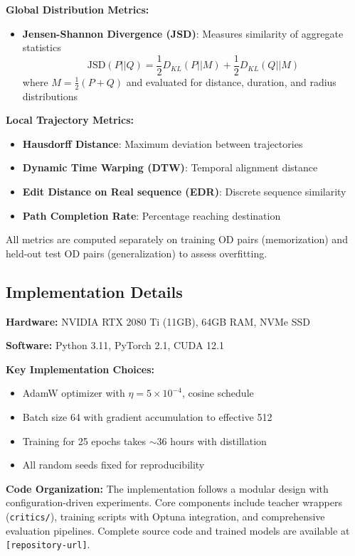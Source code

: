\textbf{Global Distribution Metrics:}
\begin{itemize}[noitemsep,topsep=0pt]
\item \textbf{Jensen-Shannon Divergence (JSD)}: Measures similarity of aggregate statistics
  \begin{equation}
  \text{JSD}(P||Q) = \frac{1}{2}D_{KL}(P||M) + \frac{1}{2}D_{KL}(Q||M)
  \end{equation}
  where $M = \frac{1}{2}(P + Q)$ and evaluated for distance, duration, and radius distributions
\end{itemize}

\textbf{Local Trajectory Metrics:}
\begin{itemize}[noitemsep,topsep=0pt]
\item \textbf{Hausdorff Distance}: Maximum deviation between trajectories
\item \textbf{Dynamic Time Warping (DTW)}: Temporal alignment distance
\item \textbf{Edit Distance on Real sequence (EDR)}: Discrete sequence similarity
\item \textbf{Path Completion Rate}: Percentage reaching destination
\end{itemize}

All metrics are computed separately on training OD pairs (memorization) and held-out test OD pairs (generalization) to assess overfitting.

\subsection{Implementation Details}
\label{sec:method-impl}

\textbf{Hardware:} NVIDIA RTX 2080 Ti (11GB), 64GB RAM, NVMe SSD

\textbf{Software:} Python 3.11, PyTorch 2.1, CUDA 12.1

\textbf{Key Implementation Choices:}
\begin{itemize}[noitemsep,topsep=0pt]
\item AdamW optimizer with $\eta = 5 \times 10^{-4}$, cosine schedule
\item Batch size 64 with gradient accumulation to effective 512
\item Training for 25 epochs takes $\sim$36 hours with distillation
\item All random seeds fixed for reproducibility
\end{itemize}

\textbf{Code Organization:} The implementation follows a modular design with configuration-driven experiments. Core components include teacher wrappers (\texttt{critics/}), training scripts with Optuna integration, and comprehensive evaluation pipelines. Complete source code and trained models are available at \texttt{[repository-url]}.